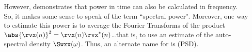 However,  
demonstrates that power in time can also be calculated in frequency.
So, it makes some sense to speak of the term ``spectral power". 
Moreover, one way to estimate this power is to average the 
Fourier Transforms of the product $\abs{\rvx(n)}^2=\rvx(n)\rvx^\ast(n)$\ldots that is, to use an estimate of 
the auto-spectral density $\Swxx(\omega)$.
Thus, an alternate name for  is  (PSD).





